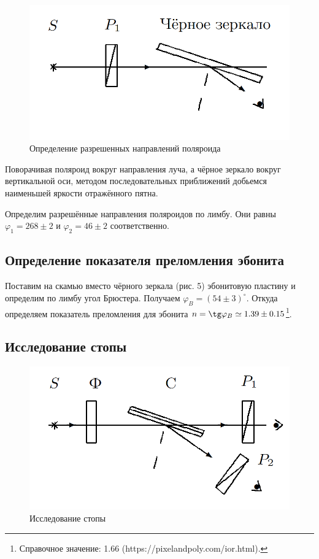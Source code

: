 \documentclass[a4paper, 12pt]{article}
\begin{document}
\begin{figure}
	\includegraphics[width=\linewidth]{5}
	\caption{Определение разрешенных направлений поляроида}
	\label{ris 5}
\end{figure}

Поворачивая поляроид вокруг направления луча, а чёрное зеркало вокруг вертикальной оси, методом последовательных приближений добьемся наименьшей яркости отражённого пятна.

Определим разрешённые направления поляроидов по лимбу. Они равны $ \varphi_1 = 268 \pm 2 $ и $ \varphi_2 = 46 \pm 2 $ соответственно. 

\subsection{Определение показателя преломления эбонита}

Поставим на скамью вместо чёрного зеркала (рис. 5) эбонитовую
пластину и определим по лимбу угол Брюстера. Получаем $ \varphi_B =(54 \pm 3) ^\circ$. Откуда определяем показатель преломления для эбонита $ n = \tg \varphi_B \simeq 1.39 \pm 0.15 $\footnote{Справочное значение: 1.66 (https://pixelandpoly.com/ior.html).}. 

\subsection{Исследование стопы}

\begin{figure}
	\includegraphics[width=\linewidth]{6}
	\caption{Исследование стопы}
	\label{ris 6}
\end{figure}
\end{document}
